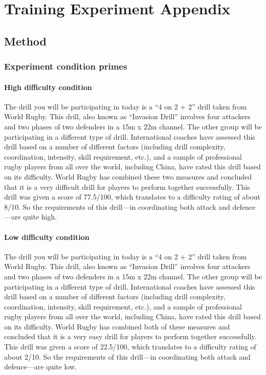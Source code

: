 \chapter{\label{app6:trainingExperiment}Training Experiment Appendix}

\section{\label{app6:method}Method}


\subsection{\label{app6:conditionPrime}Experiment condition primes}

\subsubsection{\label{app6:conditionPrimeHigh}High difficulty condition}
The drill you will be participating in today is a ``4 on 2 + 2'' drill taken from World Rugby.  This drill, also known as ``Invasion Drill'' involves four attackers and two phases of two defenders in a 15m x 22m channel.  The other group will be participating in a different type of drill.  International coaches have assessed this drill based on a number of different factors (including drill complexity, coordination, intensity, skill requirement, etc.), and a sample of professional rugby players from all over the world, including China, have rated this drill based on its difficulty.  World Rugby has combined these two measures and concluded that it is a very difficult drill for players to perform together successfully.  This drill was given a score of 77.5/100, which translates to a difficulty rating of about 8/10.  So the requirements of this drill—in coordinating both attack and defence—are quite high.

\subsubsection{\label{app6:conditionPrimeLow}Low difficulty condition}
The drill you will be participating in today is a ``4 on 2 + 2'' drill taken from World Rugby.  This drill, also known as ``Invasion Drill'' involves four attackers and two phases of two defenders in a 15m x 22m channel.  The other group will be participating in a different type of drill.  International coaches have assessed this drill based on a number of different factors (including drill complexity, coordination, intensity, skill requirement, etc.), and a sample of professional rugby players from all over the world, including China, have rated this drill based on its difficulty.  World Rugby has combined both of these measures and concluded that it is a very easy drill for players to perform together successfully.  This drill was given a score of 22.5/100, which translates to a difficulty rating of about 2/10.  So the requirements of this drill—in coordinating both attack and defence—are quite low.



